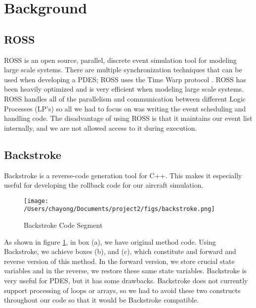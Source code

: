 \section{Background}

\subsection{ROSS}
ROSS \cite{carros} is an open source, parallel, discrete event simulation tool for modeling large scale systems.
There are multiple synchronization techniques that can be used when developing a PDES; ROSS uses the Time Warp protocol \cite{jefvir}.
ROSS has been heavily optimized and is very efficient when modeling large scale systems.
ROSS handles all of the parallelism and communication between different Logic Processes (LP's)
so all we had to focus on was writing the event scheduling and handling code.
The disadvantage of using ROSS is that it maintains our event list internally, and we are not allowed access to it during execution.

\subsection{Backstroke}
Backstroke \cite{vulthe} is a reverse-code generation tool for C++.
This makes it especially useful for developing the rollback code for our aircraft simulation. 


\begin{figure} [htd]
\centering
\texttt{[image: /Users/chayong/Documents/project2/figs/backstroke.png]}
\caption{Backstroke Code Segment}
\label{fig:backstroke}
\end{figure}


As shown in figure \ref{fig:backstroke}, in box (a), we have original method code. Using Backstroke, we achieve boxes (b), and (c), 
which constitute and forward and reverse version of this method. 
In the forward version, we store crucial state variables and in the reverse, we restore these same state variables. 
Backstroke is very useful for PDES, but it has some drawbacks. 
Backstroke does not currently support processing of loops or arrays, so we had to avoid these two constructs throughout our code
so that it would be Backstroke compatible.